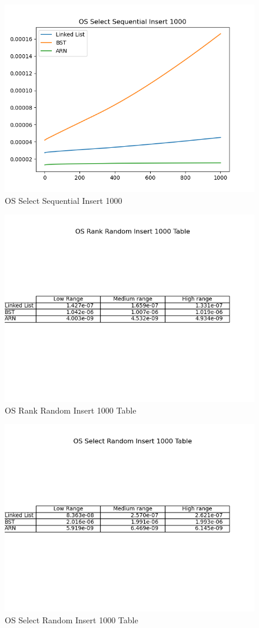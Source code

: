 \documentclass[11pt]{article}
\begin{document}
 \begin{figure}[H]
  \centering
  \includegraphics[width=0.8\linewidth]{Images/1000/OS Select Sequential Insert 1000.png}
  \caption{OS Select Sequential Insert 1000 }
  \label{fig:OS Select Sequential Insert 1000}
\end{figure}
 \begin{figure}[H]
  \centering
  \includegraphics[width=0.8\linewidth]{Images/1000/OS Rank Random Insert 1000 Table.png}
  \caption{OS Rank Random Insert 1000 Table }
  \label{fig:OS Rank Random Insert 1000 Table}
\end{figure}
 \begin{figure}[H]
  \centering
  \includegraphics[width=0.8\linewidth]{Images/1000/OS Select Random Insert 1000 Table.png}
  \caption{OS Select Random Insert 1000 Table }
  \label{fig:OS Select Random Insert 1000 Table}
\end{figure}
\end{document}
